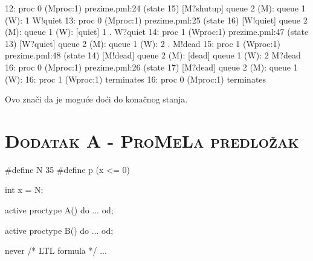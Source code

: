 \documentclass{article}
\newcommand{\sekcija}[1]{\section{\textsc{#1}}}
\begin{document}
\begin{ccode}
 12:    proc  0 (Mproc:1) prezime.pml:24 (state 15)      [M?shutup]
                queue 2 (M):
                queue 1 (W):
  1   W!quiet
 13:    proc  0 (Mproc:1) prezime.pml:25 (state 16)      [W!quiet]
                queue 2 (M):
                queue 1 (W): [quiet]
  1   .   W?quiet
 14:    proc  1 (Wproc:1) prezime.pml:47 (state 13)      [W?quiet]
                queue 2 (M):
                queue 1 (W):
  2   .   M!dead
 15:    proc  1 (Wproc:1) prezime.pml:48 (state 14)      [M!dead]
                queue 2 (M): [dead]
                queue 1 (W):
  2   M?dead
 16:    proc  0 (Mproc:1) prezime.pml:26 (state 17)      [M?dead]
                queue 2 (M):
                queue 1 (W):
 16:    proc  1 (Wproc:1)           terminates
 16:    proc  0 (Mproc:1)       terminates
\end{ccode} \newline

\noindent
Ovo znači da je moguće doći do konačnog stanja.


\pagebreak

\sekcija{Dodatak A - ProMeLa predložak}
\label{sec:promela-template}

\newline \newline

\begin{ccode}
#define N 35
#define p (x <= 0)

int x = N;

active proctype A() {
do
    ...
od;
}

active proctype B() {
do
    ...
od;
}

never { /* LTL formula */
    ...
}

\end{ccode}
\end{document}
